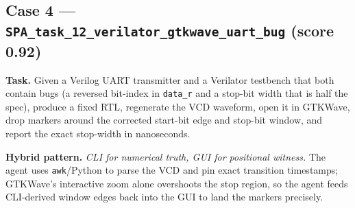 \subsection{Case 4 --- \texttt{SPA\_task\_12\_verilator\_gtkwave\_uart\_bug} (score 0.92)}
\label{app:case-uart}

\textbf{Task.} Given a Verilog UART transmitter and a Verilator testbench that both contain bugs (a reversed bit-index in \texttt{data\_r} and a stop-bit width that is half the spec), produce a fixed RTL, regenerate the VCD waveform, open it in GTKWave, drop markers around the corrected start-bit edge and stop-bit window, and report the exact stop-width in nanoseconds.

\textbf{Hybrid pattern.} \emph{CLI for numerical truth, GUI for positional witness.} The agent uses \texttt{awk}/Python to parse the VCD and pin exact transition timestamps; GTKWave's interactive zoom alone overshoots the stop region, so the agent feeds CLI-derived window edges back into the GUI to land the markers precisely.

